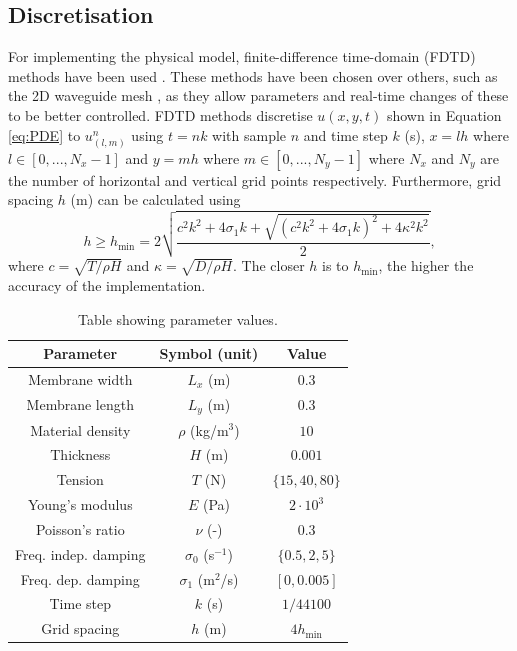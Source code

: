\documentclass{article}
\begin{document}
\subsection{Discretisation}
For implementing the physical model, finite-difference time-domain (FDTD) methods have been used \cite{bilbao2009numerical}. These methods have been chosen over others, such as the 2D waveguide mesh \cite{Duyne1993}, as they allow parameters and real-time changes of these to be better controlled. FDTD methods discretise $u(x,y,t)$ shown in Equation \eqref{eq:PDE} to $u_{(l,m)}^n$ using $t = nk$ with sample $n$ and time step $k$ (s), $x=lh$ where $l \in [0, ..., N_x-1]$ and $y=mh$ where $m \in [0, ..., N_y-1]$ where $N_x$ and $N_y$ are the number of horizontal and vertical grid points respectively. Furthermore, grid spacing $h$ (m) can be calculated using 
\begin{equation}\label{eq:h}
    h \geq h_\text{min} =  2\sqrt{\frac{c^2k^2 + 4\sigma_1k + \sqrt{(c^2k^2 + 4\sigma_1k)^2 + 4\kappa^2 k^2} }{2}},
\end{equation}
where $c = \sqrt{T/\rho H}$ and $\kappa = \sqrt{D/\rho H}$. The closer $h$ is to $h_\text{min}$, the higher the accuracy of the implementation.

\begin{table}[b]
\caption{Table showing parameter values.}\label{tab:parameters}
\centering
\begin{tabular}{|c|c|c|}
    \hline
    Parameter & Symbol (unit) & Value \\
    \hline
    Membrane width & $L_x$ (m) & $0.3$\\
    Membrane length & $L_y$ (m) & $0.3$ \\
    Material density & $\rho$ (kg/m$^3$)& $10$ \\
    Thickness & $H$ (m) & $0.001$ \\
    Tension & $T$ (N) & $\{15, 40, 80\}$ \\
    Young's modulus & $E$ (Pa)& $2\cdot 10^3$ \\
    Poisson's ratio & $\nu$ (-)& $0.3$ \\
    Freq. indep. damping & $\sigma_0$ (s$^{-1}$) & $\{0.5, 2, 5\}$\\
    Freq. dep. damping & $\sigma_1$ (m$^2$/s) & $[0, 0.005]$\\
    Time step & $k$ (s) & $1/44100$\\
    Grid spacing & $h$ (m) & $4h_\text{min}$\\
    \hline
\end{tabular}
\end{table}
\end{document}
